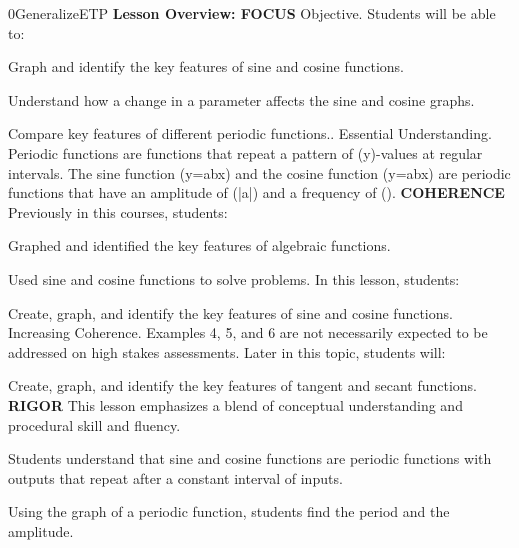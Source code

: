 \documentclass{article}
\newenvironment{te-addendum}[2]{}{}     %
\newcommand{\te}[1]{}                   %
\begin{document}
\begin{te-addendum}{0}{GeneralizeETP}
\textbf{Lesson Overview: FOCUS}
Objective. Students will be able to:
\item Graph and identify the key features of sine and cosine functions.
\item Understand how a change in a parameter affects the sine and cosine graphs.
\item Compare key features of different periodic functions..
Essential Understanding. Periodic functions are functions that repeat a pattern of (y)-values at regular intervals. The sine function (y=a\sin bx) and the cosine function (y=a\cos bx) are periodic functions that have an amplitude of (|a|) and a frequency of ().
\textbf{COHERENCE}
Previously in this courses, students:
\item Graphed and identified the key features of algebraic functions.
\item Used sine and cosine functions to solve problems.
In this lesson, students:
\item Create, graph, and identify the key features of sine and cosine functions.
Increasing Coherence. Examples 4, 5, and 6 are not necessarily expected to be addressed on high stakes assessments.
Later in this topic, students will:
\item Create, graph, and identify the key features of tangent and secant functions.
\textbf{RIGOR}
This lesson emphasizes a blend of conceptual understanding and procedural skill and fluency.
\item Students understand that sine and cosine functions are periodic functions with outputs that repeat after a constant interval of inputs.
\item Using the graph of a periodic function, students find the period and the amplitude.
\te{Printed double period after functions and wording "in this courses" retained.}
\end{te-addendum}
\end{document}
